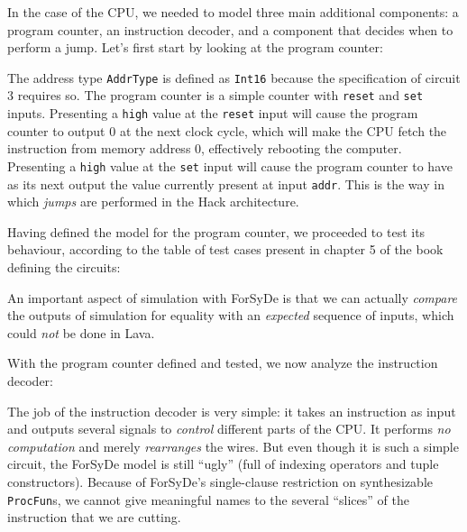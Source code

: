 \documentclass[a4paper]{article}
\begin{document}
                In the case of the CPU, we needed to model three main additional components: a
                program counter, an instruction decoder, and a component that decides when to
                perform a jump. Let's first start by looking at the program counter:


                The address type \texttt{AddrType} is defined as \texttt{Int16} because the
                specification of circuit 3 requires so. The program counter is a simple counter with
                \texttt{reset} and \texttt{set} inputs. Presenting a \texttt{high} value at the
                \texttt{reset} input will cause the program counter to output 0 at the next clock
                cycle, which will make the CPU fetch the instruction from memory address 0,
                effectively rebooting the computer. Presenting a \texttt{high} value at the
                \texttt{set} input will cause the program counter to have as its next output the
                value currently present at input \texttt{addr}. This is the way in which
                \emph{jumps} are performed in the Hack architecture.

                Having defined the model for the program counter, we proceeded to test its
                behaviour, according to the table of test cases present in chapter
                5\cite{nand2tetris-chapter-cpu} of the book defining the circuits:


                An important aspect of simulation with ForSyDe is that we can actually
                \emph{compare} the outputs of simulation for equality with an \emph{expected}
                sequence of inputs, which could \emph{not} be done in Lava.

                With the program counter defined and tested, we now analyze the instruction decoder:


                The job of the instruction decoder is very simple: it takes an instruction as input
                and outputs several signals to \emph{control} different parts of the CPU. It
                performs \emph{no computation} and merely \emph{rearranges} the wires. But even
                though it is such a simple circuit, the ForSyDe model is still ``ugly'' (full of
                indexing operators and tuple constructors). Because of ForSyDe's single-clause
                restriction on synthesizable \texttt{ProcFun}s, we cannot give meaningful names to
                the several ``slices'' of the instruction that we are cutting.
\end{document}
